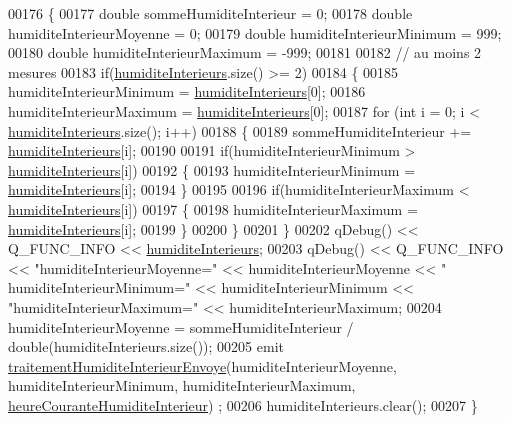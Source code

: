 \begin{DoxyCode}
00176 \{
00177     \textcolor{keywordtype}{double} sommeHumiditeInterieur = 0;
00178     \textcolor{keywordtype}{double} humiditeInterieurMoyenne = 0;
00179     \textcolor{keywordtype}{double} humiditeInterieurMinimum = 999;
00180     \textcolor{keywordtype}{double} humiditeInterieurMaximum = -999;
00181 
00182     \textcolor{comment}{// au moins 2 mesures}
00183     \textcolor{keywordflow}{if}(\hyperlink{class_infos_humidite_a2bcd5b3629a007078d4e15d110dae457}{humiditeInterieurs}.size() >= 2)
00184     \{
00185         humiditeInterieurMinimum = \hyperlink{class_infos_humidite_a2bcd5b3629a007078d4e15d110dae457}{humiditeInterieurs}[0];
00186         humiditeInterieurMaximum = \hyperlink{class_infos_humidite_a2bcd5b3629a007078d4e15d110dae457}{humiditeInterieurs}[0];
00187         \textcolor{keywordflow}{for} (\textcolor{keywordtype}{int} i = 0; i < \hyperlink{class_infos_humidite_a2bcd5b3629a007078d4e15d110dae457}{humiditeInterieurs}.size(); i++)
00188         \{
00189             sommeHumiditeInterieur += \hyperlink{class_infos_humidite_a2bcd5b3629a007078d4e15d110dae457}{humiditeInterieurs}[i];
00190 
00191             \textcolor{keywordflow}{if}(humiditeInterieurMinimum > \hyperlink{class_infos_humidite_a2bcd5b3629a007078d4e15d110dae457}{humiditeInterieurs}[i])
00192             \{
00193                 humiditeInterieurMinimum = \hyperlink{class_infos_humidite_a2bcd5b3629a007078d4e15d110dae457}{humiditeInterieurs}[i];
00194             \}
00195 
00196             \textcolor{keywordflow}{if}(humiditeInterieurMaximum < \hyperlink{class_infos_humidite_a2bcd5b3629a007078d4e15d110dae457}{humiditeInterieurs}[i])
00197             \{
00198                 humiditeInterieurMaximum = \hyperlink{class_infos_humidite_a2bcd5b3629a007078d4e15d110dae457}{humiditeInterieurs}[i];
00199             \}
00200         \}
00201     \}
00202     qDebug() << Q\_FUNC\_INFO << \hyperlink{class_infos_humidite_a2bcd5b3629a007078d4e15d110dae457}{humiditeInterieurs};
00203     qDebug() << Q\_FUNC\_INFO << \textcolor{stringliteral}{"humiditeInterieurMoyenne="} << humiditeInterieurMoyenne << \textcolor{stringliteral}{"
      humiditeInterieurMinimum="} << humiditeInterieurMinimum << \textcolor{stringliteral}{"humiditeInterieurMaximum="} << humiditeInterieurMaximum;
00204     humiditeInterieurMoyenne = sommeHumiditeInterieur / double(humiditeInterieurs.size());
00205     emit \hyperlink{class_infos_humidite_a3643afa07ff3ac73a4190d77ce230d3b}{traitementHumiditeInterieurEnvoye}(humiditeInterieurMoyenne, 
      humiditeInterieurMinimum, humiditeInterieurMaximum, \hyperlink{class_infos_humidite_a5a8597751ba0fe10a14a12e155421485}{heureCouranteHumiditeInterieur})
      ;
00206     humiditeInterieurs.clear();
00207 \}
\end{DoxyCode}
\mbox{\label{class_infos_humidite_a04abb2841492704e125874464052bb4f}} 
